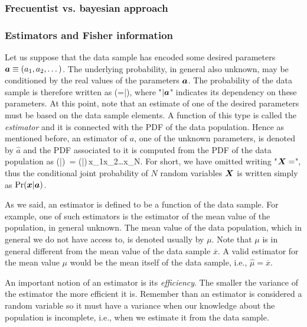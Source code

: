 \subsubsection{Frecuentist vs. bayesian approach}

\subsubsection{Estimators and Fisher information}
\label{sec:bg-estimators}

Let us suppose that the data sample has encoded some desired parameters $\boldsymbol{a}\equiv(a_1,a_2,\dots)$.
The underlying probability, in general also unknown, may be conditioned by the real values of the parameters $\boldsymbol{a}$.
The probability of the data sample is therefore written as
\be
  \prob(=|),
\ee
where "$|\boldsymbol{a}$" indicates its dependency on these parameters.
At this point, note that an estimate of one of the desired parameters must be based on the data sample elements.
A function of this type is called the \emph{estimator} and it is connected with the PDF of the data population.
Hence as mentioned before, an estimator of $a$, one of the unknown parameters, is denoted by $\hat{a}$ and the PDF associated to it is computed from the PDF of the data population as
\be
  \prob(|)\, = \prob(|)\,x_1x_2\dots{}x_N.
\ee
For short, we have omitted writing "$\boldsymbol{X}=$", thus the conditional joint probability of $N$ random variables $\boldsymbol{X}$ is written simply as $\text{Pr}(\boldsymbol{x}|\boldsymbol{a})$.

As we said, an estimator is defined to be a function of the data sample.
For example, one of such estimators is the estimator of the mean value of the population, in general unknown.
The mean value of the data population, which in general we do not have access to, is denoted usually by $\mu$.
Note that $\mu$ is in general different from the mean value of the data sample $\overline{x}$.
A valid estimator for the mean value $\mu$ would be the mean itself of the data sample, i.e., $\hat{\mu}=\overline{x}$.

An important notion of an estimator is its \emph{efficiency}.
The smaller the variance of the estimator the more efficient it is.
Remember than an estimator is considered a random variable so it must have a variance when our knowledge about the population is incomplete, i.e., when we estimate it from the data sample.

